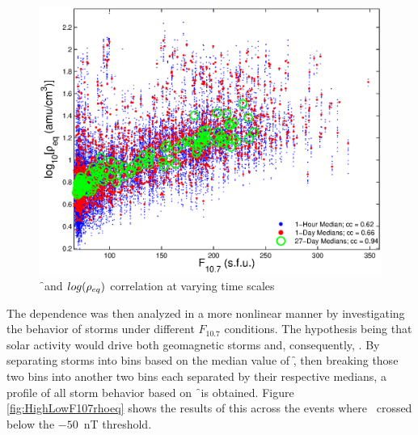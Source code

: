 \begin{figure}[htp!]
	\centering
	\includegraphics[width=0.7\linewidth]{Figures/ccplot-GOES6}
	\caption{\f\ and $log(\rho_{eq})$ correlation at varying time scales}
	\label{fig:ccplot}
\end{figure}


The dependence was then analyzed in a more nonlinear manner by investigating the behavior of storms under different $F_{10.7}$ conditions. The hypothesis being that solar activity would drive both geomagnetic storms and, consequently, \req. By separating storms into bins based on the median value of \f, then breaking those two bins into another two bins each separated by their respective medians, a profile of all storm behavior based on \f\ is obtained. Figure \ref{fig:HighLowF107rhoeq} shows the results of this across the events where \dst\ crossed below the $-50$~nT threshold. 

